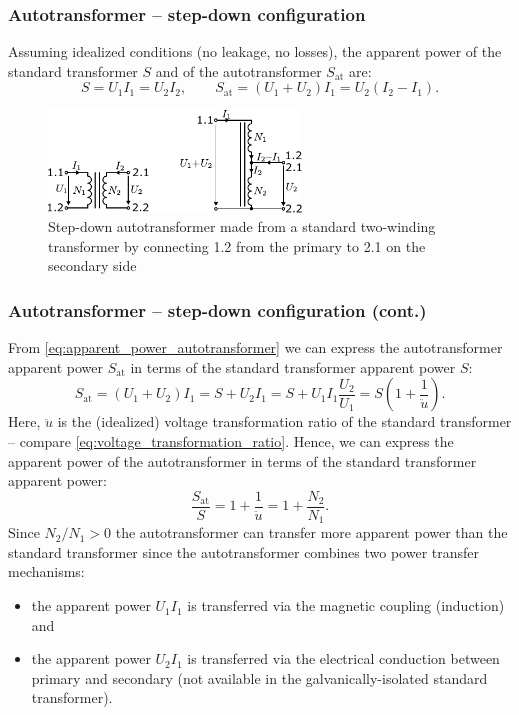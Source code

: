 \begin{frame}
	\frametitle{Autotransformer -- step-down configuration}
	Assuming idealized conditions (no leakage, no losses), the apparent power of the standard transformer $S$ and of the autotransformer $S_\mathrm{at}$ are:
	\begin{equation}
		S= U_1 I_1 = U_2 I_2, \qquad S_\mathrm{at} = (U_1+U_2) I_1 = U_2 (I_2-I_1).
		\label{eq:apparent_power_autotransformer}
	\end{equation}
	\begin{figure}
		\includegraphics[width=0.6\textwidth]{fig/lec04/Autotransformer_step_down.pdf}
		\caption{Step-down autotransformer made from a standard two-winding transformer by connecting 1.2 from the primary to 2.1 on the secondary side}
		\label{fig:Autotransformer_step_down}
	\end{figure}
\end{frame}

\begin{frame}
	\frametitle{Autotransformer -- step-down configuration  (cont.)}
	From \eqref{eq:apparent_power_autotransformer} we can express the autotransformer apparent power $S_\mathrm{at}$ in terms of the standard transformer apparent power $S$:
	\begin{equation}
		S_\mathrm{at} = (U_1+U_2) I_1 = S + U_2 I_1 = S + U_1 I_1 \frac{U_2}{U_1} = S(1+\frac{1}{\ddot{u}}).
	\end{equation}
	Here, $\ddot{u}$ is the (idealized) voltage transformation ratio of the standard transformer -- compare \eqref{eq:voltage_transformation_ratio}. \pause Hence, we can express the apparent power of the autotransformer in terms of the standard transformer apparent power:
	\begin{equation}
		\frac{S_\mathrm{at}}{S} = 1+\frac{1}{\ddot{u}} = 1 + \frac{N_2}{N_1}.
	\end{equation} \pause
	Since $N_2 / N_1 > 0$ the autotransformer can transfer more apparent power than the standard transformer since the autotransformer combines two power transfer mechanisms: \pause
	\begin{itemize}
		\item the apparent power $U_1 I_1$ is transferred via the magnetic coupling (induction) and \pause
		\item the apparent power $U_2 I_1$ is transferred via the electrical conduction between primary and secondary (not available in the galvanically-isolated standard transformer).
	\end{itemize}
\end{frame}

